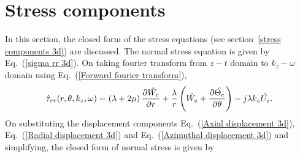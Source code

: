 \documentclass[10pt]{asme2ej}
\begin{document}
\section{Stress components}\label{stress components appendix}
In this section, the closed form of the stress equations (see section~\ref{stress components 3d}) are discussed. The normal stress equation is given by Eq.~(\ref{sigma rr 3d}). On taking fourier transform from $z-t$ domain to $k_z-\omega$ domain using Eq.~(\ref{Forward fourier transform}),
\begin{equation}
    \Hat{\tau}_{rr}(r,\theta,k_z,\omega) = \left(\lambda+2\mu\right)\frac{\partial \Hat{W_{e}}}{\partial r} + \frac{\lambda}{r}\left(\Hat{W_{e}} + \frac{\partial \Hat{\Theta_e}}{\partial \theta} \right) - j \lambda k_z \Hat{U_e}.
\end{equation}
    On substituting the displacement components Eq.~(\ref{Axial displacement 3d}), Eq.~(\ref{Radial displacement 3d}) and Eq.~(\ref{Azimuthal displacement 3d}) and simplifying, the closed form of normal stress is given by
\end{document}
